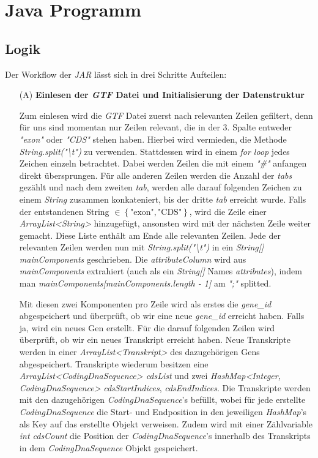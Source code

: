 \documentclass[12pt]{article}
\begin{document}
\section{Java Programm}
\subsection{Logik}\label{sec:logik}
Der Workflow der \textit{JAR} lässt sich in drei Schritte Aufteilen:
\begin{enumerate}
	\item[(A)] \textbf{Einlesen der \textit{GTF} Datei und Initialisierung der Datenstruktur}

		Zum einlesen wird die \textit{GTF} Datei zuerst nach relevanten Zeilen gefiltert, denn
		für uns sind momentan nur Zeilen relevant, die in der 3. Spalte entweder
		\textit{"exon"} oder \textit{"CDS"} stehen haben. Hierbei wird vermieden,
		die Methode \textit{String.split("\textbackslash t")} zu verwenden.
		Stattdessen wird in einem \textit{for loop} jedes Zeichen einzeln betrachtet.
		Dabei werden Zeilen die mit einem \textit{"\#"} anfangen direkt übersprungen.
		Für alle anderen Zeilen werden die Anzahl der \textit{tabs} gezählt und nach
		dem zweiten \textit{tab}, werden alle darauf folgenden Zeichen zu einem
		\textit{String} zusammen konkateniert, bis der dritte \textit{tab}
		erreicht wurde. Falls der entstandenen String $\in \left\{\text{"exon"}, \text{"CDS"} \right\}$, wird die
		Zeile einer \textit{ArrayList<String>} hinzugefügt, ansonsten wird mit der nächsten Zeile weiter gemacht.
		Diese Liste enthält am Ende alle relevanten Zeilen.
		Jede der relevanten Zeilen werden nun mit \textit{String.split("\textbackslash t")} in
		ein \textit{String[] mainComponents} geschrieben. Die \textit{attributeColumn} wird aus
		\textit{mainComponents} extrahiert (auch als ein \textit{String[]} Names \textit{attributes}),
		indem man \textit{mainComponents[mainComponents.length - 1]} am \textit{";"} splitted.

		Mit diesen zwei Komponenten pro Zeile wird als erstes die \textit{gene\_id} abgespeichert
		und überprüft, ob wir eine neue \textit{gene\_id} erreicht haben.
		Falls ja, wird ein neues Gen erstellt. Für die darauf folgenden Zeilen wird überprüft,
		ob wir ein neues Transkript erreicht haben. Neue Transkripte werden in einer
		\textit{ArrayList<Transkript>} des dazugehörigen Gens abgespeichert.
		Transkripte wiederum besitzen eine \textit{ArrayList<CodingDnaSequence> cdsList} und zwei
		\textit{HashMap<Integer, CodingDnaSequence>} \textit{cdsStartIndices}, \textit{cdsEndIndices}. Die Transkripte werden mit den dazugehörigen
		\textit{CodingDnaSequence}'s befüllt, wobei für jede erstellte \textit{CodingDnaSequence} die Start- und
		Endposition in den jeweiligen \textit{HashMap}'s als Key auf das erstellte Objekt verweisen.
		Zudem wird mit einer Zählvariable \textit{int cdsCount} die Position der \textit{CodingDnaSequence}'s
		innerhalb des Transkripts in dem \textit{CodingDnaSequence} Objekt gespeichert.


\end{enumerate}
\end{document}
